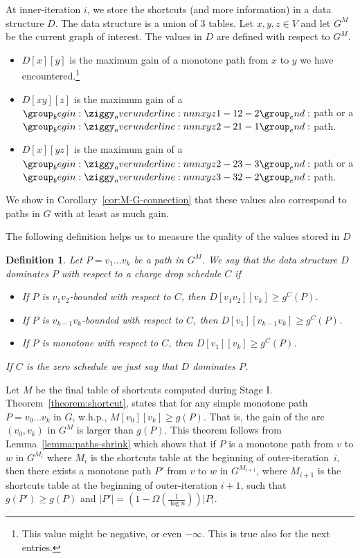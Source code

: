 \documentclass[11pt]{article}
\newtheorem{definition}[theorem]{Definition}
\begin{document}
At inner-iteration $i$, we store the shortcuts (and more information) in a data structure $D$. The data structure is a union of $3$ tables. Let $x,y,z\in V$ and let $G^M$ be the current graph of interest. The values in $D$ are defined with respect to $G^M$.

\begin{itemize}
    \item $D[x][y]$ is the maximum gain of a monotone path from $x$ to $y$ we have encountered.\footnote{This value might be negative, or even $-\infty$. This is true also for the next entries.}
    \item $D[xy][z]$ is the maximum gain of a $\overunderline{xyz}{1-1}{2-2}$ path or a $\overunderline{xyz}{2-2}{1-1}$ path. 
    \item $D[x][yz]$ is the maximum gain of a $\overunderline{xyz}{2-2}{3-3}$ path or a $\overunderline{xyz}{3-3}{2-2}$ path.
\end{itemize}

We show in Corollary~\ref{cor:M-G-connection} that these values also correspond to paths in $G$ with at least as much gain.

The following definition  helps us to measure the quality of the values stored in $D$

\begin{definition}
    Let $P=v_1 \ldots v_k$ be a path in $G^M$. We say that the data structure $D$ \emph{dominates} $P$ with respect to a charge drop schedule $C$ if 
    \begin{itemize}
        \item If $P$ is $v_1 v_2$-bounded with respect to $C$, then $D[v_1 v_2][v_k] \ge g^C(P)$.
        \item If $P$ is $v_{k-1} v_k$-bounded with respect to $C$, then $D[v_1][v_{k-1} v_k] \ge g^C(P)$.
        \item If $P$ is monotone with respect to $C$, then $D[v_1][v_k]\ge g^C(P)$.
    \end{itemize}
    If $C$ is the zero schedule we just say that $D$ dominates $P$.
\end{definition}



Let $M$ be the final table of shortcuts computed during Stage I.
Theorem~\ref{theorem:shortcut}, states that for any simple monotone path $P=v_0\ldots v_k$ in $G$, w.h.p.,  $M[v_0][v_k]\ge g(P)$. 
That is, the gain of the arc $(v_0,v_k)$ in
$G^M$ is larger than 
$g(P)$.
This theorem follows from 
Lemma~\ref{lemma:paths-shrink} which shows 
that if $P$ is a monotone path from $v$ to $w$ in $G^{M_i}$
where $M_i$ is the shortcuts table at the beginning of outer-iteration~$i$,
 then there exists a monotone path $P'$ from $v$ to $w$ in $G^{M_{i+1}}$,
where 
$M_{i+1}$ is the shortcuts table at the beginning of outer-iteration $i+1$,
such that  $g(P')\ge g(P)$
and 
 $|P'|=\left(1-\Omega\left( \frac{1}{\log n}\right) \right)|P|$. 
\end{document}
